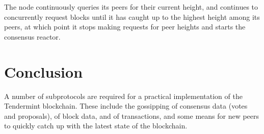 The node continuously queries its peers for their current height, 
and continues to concurrently request blocks until it has caught up to the highest height among its peers, 
at which point it stops making requests for peer heights and starts the consensus reactor.

\section{Conclusion}

A number of subprotocols are required for a practical implementation of the Tendermint blockchain.
These include the gossipping of consensus data (votes and proposals), of block data, and of transactions,
and some means for new peers to quickly catch up with the latest state of the blockchain.
